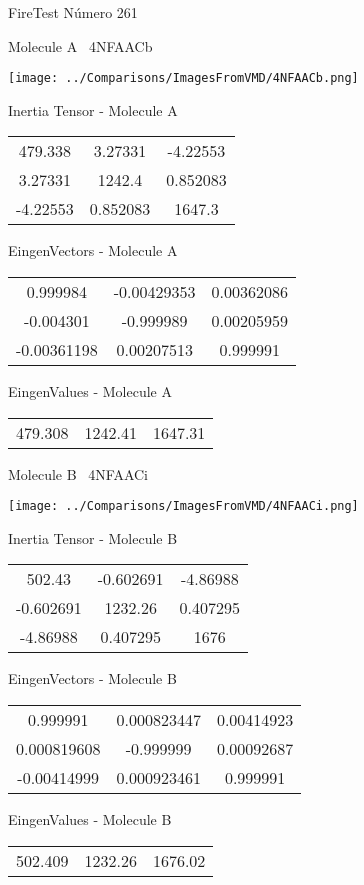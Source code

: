 \vtab[-3cm]
\begin{center}
{\large FireTest \tab Número 261}
\end{center}
\begin{multicols}{2}
\begin{center}

Molecule A \
4NFAACb

\texttt{[image: ../Comparisons/ImagesFromVMD/4NFAACb.png]}

Inertia Tensor - Molecule A \\
\begin{tabular}{|c c c|}
479.338	 & 	3.27331	 & 	-4.22553	 \\
3.27331	 & 	1242.4	 & 	0.852083	 \\
-4.22553	 & 	0.852083	 & 	1647.3
\end{tabular}

\vtab
 EingenVectors - Molecule A     \\
\begin{tabular}{|c c c|}
0.999984	 & 	-0.00429353	 & 	0.00362086	 \\
-0.004301	 & 	-0.999989	 & 	0.00205959	 \\
-0.00361198	 & 	0.00207513	 & 	0.999991
\end{tabular}

\vtab
 EingenValues - Molecule A     \\
\begin{tabular}{|c c c|}
479.308	 & 	1242.41	 & 	1647.31	 \\
\end{tabular}
\columnbreak

Molecule B \
4NFAACi

\texttt{[image: ../Comparisons/ImagesFromVMD/4NFAACi.png]}

Inertia Tensor - Molecule B \\
\begin{tabular}{|c c c|}
502.43	 & 	-0.602691	 & 	-4.86988	 \\
-0.602691	 & 	1232.26	 & 	0.407295	 \\
-4.86988	 & 	0.407295	 & 	1676
\end{tabular}

\vtab
 EingenVectors - Molecule B     \\
\begin{tabular}{|c c c|}
0.999991	 & 	0.000823447	 & 	0.00414923	 \\
0.000819608	 & 	-0.999999	 & 	0.00092687	 \\
-0.00414999	 & 	0.000923461	 & 	0.999991
\end{tabular}

\vtab
 EingenValues - Molecule B     \\
\begin{tabular}{|c c c|}
502.409	 & 	1232.26	 & 	1676.02	 \\
\end{tabular}

\end{center}
\end{multicols}

